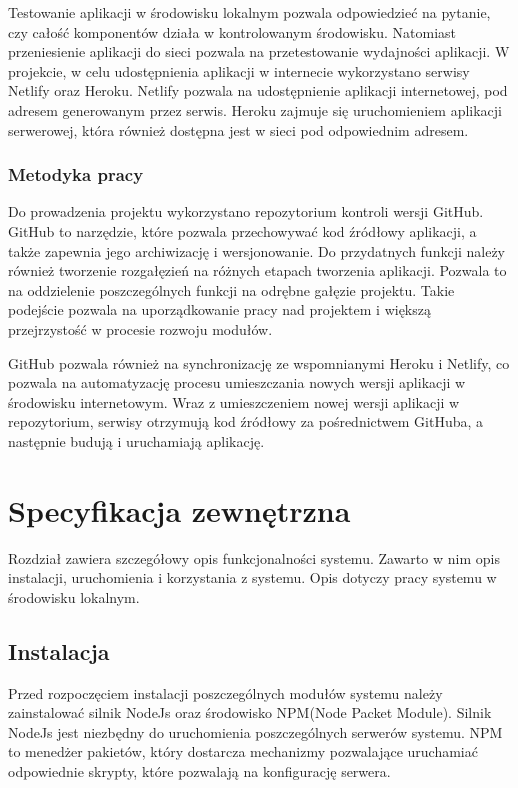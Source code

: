 \documentclass[a4paper,12pt]{book}
\begin{document}
Testowanie aplikacji w środowisku lokalnym pozwala odpowiedzieć na pytanie, czy całość komponentów działa w kontrolowanym środowisku. Natomiast przeniesienie aplikacji do sieci pozwala na przetestowanie wydajności aplikacji. W projekcie, w celu udostępnienia aplikacji w internecie wykorzystano serwisy Netlify oraz Heroku. Netlify pozwala na udostępnienie aplikacji internetowej, pod adresem generowanym przez serwis. Heroku zajmuje się uruchomieniem aplikacji serwerowej, która również dostępna jest w sieci pod odpowiednim adresem.

\subsection{Metodyka pracy}
 
Do prowadzenia projektu wykorzystano repozytorium kontroli wersji GitHub. GitHub to narzędzie, które pozwala przechowywać kod źródłowy aplikacji, a także zapewnia jego archiwizację i wersjonowanie. Do przydatnych funkcji należy również tworzenie rozgałęzień na różnych etapach tworzenia aplikacji. Pozwala to na oddzielenie poszczególnych funkcji na odrębne gałęzie projektu. Takie podejście pozwala na uporządkowanie pracy nad projektem i większą przejrzystość w procesie rozwoju modułów.
 
GitHub pozwala również na synchronizację ze wspomnianymi Heroku i Netlify, co pozwala na automatyzację procesu umieszczania nowych wersji aplikacji w środowisku internetowym. Wraz z umieszczeniem nowej wersji aplikacji w repozytorium, serwisy otrzymują kod źródłowy za pośrednictwem GitHuba, a następnie budują i uruchamiają aplikację.
 

\chapter{Specyfikacja zewnętrzna}
Rozdział zawiera szczegółowy opis funkcjonalności systemu. Zawarto w nim opis instalacji, uruchomienia i korzystania z systemu. Opis dotyczy pracy systemu w środowisku lokalnym.

\section{Instalacja}
Przed rozpoczęciem instalacji poszczególnych modułów systemu należy zainstalować silnik NodeJs oraz środowisko NPM(Node Packet Module). Silnik NodeJs jest niezbędny do uruchomienia poszczególnych serwerów systemu. NPM to menedżer pakietów, który dostarcza mechanizmy pozwalające uruchamiać odpowiednie skrypty, które pozwalają na konfigurację serwera. 
\end{document}
